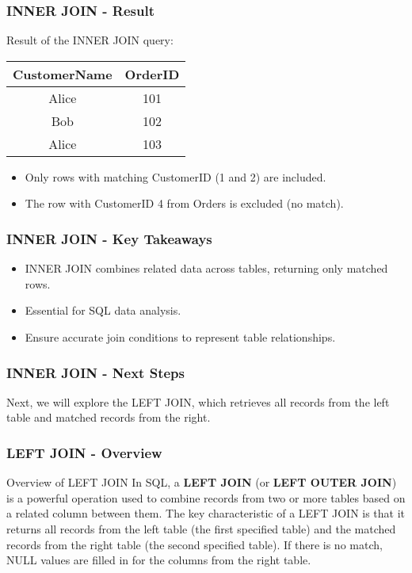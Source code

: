 \documentclass[aspectratio=169]{beamer}
\begin{document}
\begin{frame}[fragile]
    \frametitle{INNER JOIN - Result}
    Result of the INNER JOIN query:
    \begin{center}
        \begin{tabular}{|c|c|}
            \hline
            CustomerName & OrderID \\
            \hline
            Alice & 101 \\
            Bob & 102 \\
            Alice & 103 \\
            \hline
        \end{tabular}
    \end{center}
    \begin{itemize}
        \item Only rows with matching CustomerID (1 and 2) are included.
        \item The row with CustomerID 4 from Orders is excluded (no match).
    \end{itemize}
\end{frame}

\begin{frame}[fragile]
    \frametitle{INNER JOIN - Key Takeaways}
    \begin{itemize}
        \item INNER JOIN combines related data across tables, returning only matched rows.
        \item Essential for SQL data analysis.
        \item Ensure accurate join conditions to represent table relationships.
    \end{itemize}
\end{frame}

\begin{frame}[fragile]
    \frametitle{INNER JOIN - Next Steps}
    Next, we will explore the LEFT JOIN, which retrieves all records from the left table and matched records from the right.
\end{frame}

\begin{frame}[fragile]
    \frametitle{LEFT JOIN - Overview}
    \begin{block}{Overview of LEFT JOIN}
        In SQL, a \textbf{LEFT JOIN} (or \textbf{LEFT OUTER JOIN}) is a powerful operation used to combine records from two or more tables based on a related column between them. 
        The key characteristic of a LEFT JOIN is that it returns all records from the left table (the first specified table) and the matched records from the right table (the second specified table). If there is no match, NULL values are filled in for the columns from the right table.
    \end{block}
\end{frame}
\end{document}
